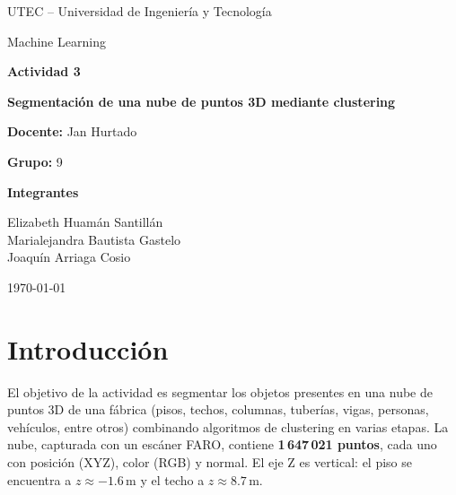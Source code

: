 \documentclass[11pt,a4paper]{article}
\newcommand{\grupo}{9}
\begin{document}
\begin{titlepage}
  \centering
  {\large UTEC -- Universidad de Ingeniería y Tecnología\par}
  \vspace{0.5cm}
  {\large Machine Learning\par}
  \vspace{3cm}
  {\LARGE\bfseries Actividad 3\par}
  \vspace{0.4cm}
  {\Huge\bfseries Segmentación de una nube de puntos 3D mediante clustering\par}
  \vspace{3cm}
  {\large\textbf{Docente:} Jan Hurtado\par}
  \vspace{0.8cm}
  {\large\textbf{Grupo:} \grupo\par}
  \vspace{0.8cm}
  {\large\textbf{Integrantes}\par}
  \vspace{0.3cm}
  {\large
    Elizabeth Huamán Santillán\\
    Marialejandra Bautista Gastelo\\
    Joaquín Arriaga Cosio\par}
  \vfill
  {\large \today\par}
\end{titlepage}

\section{Introducción}
El objetivo de la actividad es segmentar los objetos presentes en una nube de
puntos 3D de una fábrica (pisos, techos, columnas, tuberías, vigas, personas,
vehículos, entre otros) combinando algoritmos de clustering en varias etapas.
La nube, capturada con un escáner FARO, contiene \textbf{1\,647\,021 puntos},
cada uno con posición (XYZ), color (RGB) y normal. El eje Z es vertical: el
piso se encuentra a $z \approx -1.6$\,m y el techo a $z \approx 8.7$\,m.
\end{document}
